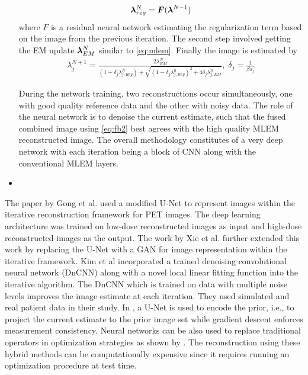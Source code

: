 \begin{itemize}
\begin{equation}\label{eq:fbs1}
\bm{\lambda}_{reg}^N = \bm{F}(\bm{\lambda}^{N-1})
\end{equation} 
where $F$ is a residual neural network estimating the regularization term based on the image from the previous iteration. 
The second step involved getting the EM update $\bm{\lambda}_{EM}^{N}$ similar to \ref{eq:mlem}. Finally the image is estimated by
\begin{equation}\label{eq:fb2}
\begin{array}{l}
\lambda_j^{N+1} 
=\frac{2 \lambda_{E M}^{N}}{\left(1-\delta_{j} \lambda_{j, R e g}^{N}\right)+\sqrt{\left(1-\delta_{j} \lambda_{j, R e g}^{n}\right)^{2}+4 \delta_{j} \lambda_{j, E M}^{n}}} ,\; \delta_{j}=\frac{1}{\beta s_{j}}
\end{array}
\end{equation}

During the network training, two reconstructions occur simultaneously, one with good quality reference data and the other with noisy data. The role of the neural network is to denoise the current estimate, such that the fused combined image using \ref{eq:fb2} best agrees with the high quality \ac{MLEM} reconstructed image. The overall methodology constitutes of a very deep network with each iteration being a block of \ac{CNN} along with the conventional \ac{MLEM} layers. 


\item 


\end{itemize}

The paper by Gong et al. used a modified U-Net to represent images within the iterative reconstruction framework for \ac{PET} images. The deep learning architecture was trained on low-dose reconstructed images as input and high-dose reconstructed images as the output. The work by Xie et al. further extended this work by replacing the U-Net with a \ac{GAN} for image representation within the iterative framework. Kim et al incorporated a trained denoising convolutional neural network (DnCNN) along with a novel local linear fitting function into the iterative algorithm. The DnCNN which is trained on data with multiple noise levels improves the image estimate at each iteration. They used simulated and real patient data in their study. In \cite{gupta2018cnn}, a U-Net is used to encode the prior, i.e., to project the current estimate to the prior image set while gradient descent enforces measurement consistency. Neural networks can be also used to replace traditional operators in optimization strategies as shown by \cite{adler2018learned}. The reconstruction using these hybrid methods can be computationally expensive since it requires running an optimization procedure at test time.

